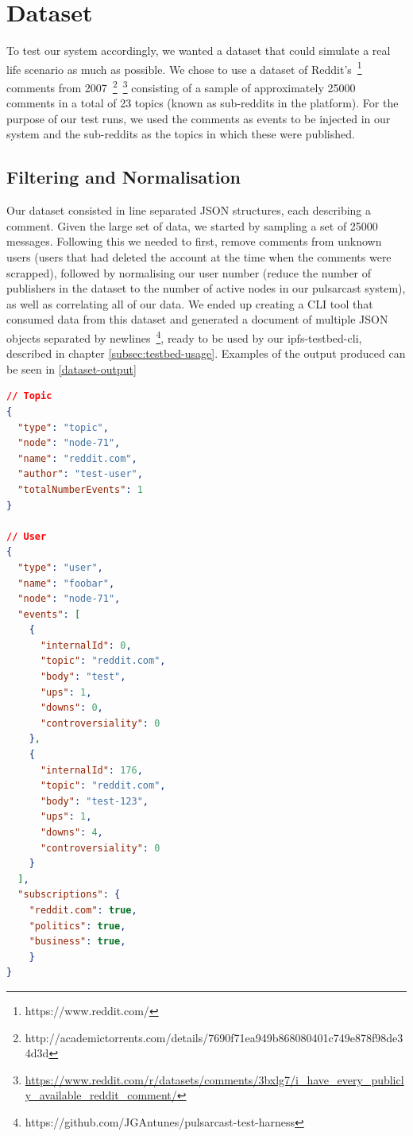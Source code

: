 \section{Dataset}\label{dataset}

To test our system accordingly, we wanted a dataset that could simulate a real
life scenario as much as possible. We chose to use a dataset of
Reddit's~\footnote{https://www.reddit.com/} comments from
2007~\footnote{http://academictorrents.com/details/7690f71ea949b868080401c749e878f98de34d3d}~\footnote{\url{https://www.reddit.com/r/datasets/comments/3bxlg7/i_have_every_publicly_available_reddit_comment/}} consisting of a sample of approximately 25000 comments in a total of 23 topics (known as sub-reddits in the platform). For the purpose of our test runs, we used the comments as events to be injected in our system and the sub-reddits as the topics in which these were published.

\subsection{Filtering and Normalisation}\label{subsec:filtering}

Our dataset consisted in line separated JSON structures, each describing a
comment. Given the large set of data, we started by sampling a set of 25000
messages.  Following this we needed to first, remove comments from unknown
users (users that had deleted the account at the time when the comments were
scrapped), followed by normalising our user number (reduce the number of
publishers in the dataset to the number of active nodes in our pulsarcast
system), as well as correlating all of our data. We ended up creating a CLI
tool that consumed data from this dataset and generated a document of multiple
JSON objects separated by
newlines~\footnote{https://github.com/JGAntunes/pulsarcast-test-harness}, ready
to be used by our ipfs-testbed-cli, described in chapter
\ref{subsec:testbed-usage}. Examples of the output produced can be seen in
\ref{dataset-output}

\begin{lstlisting}[language=JSON, float, caption={Data example to be used in testbed},label={dataset-output}]
// Topic
{
  "type": "topic",
  "node": "node-71",
  "name": "reddit.com",
  "author": "test-user",
  "totalNumberEvents": 1
}

// User
{
  "type": "user",
  "name": "foobar",
  "node": "node-71",
  "events": [
    {
      "internalId": 0,
      "topic": "reddit.com",
      "body": "test",
      "ups": 1,
      "downs": 0,
      "controversiality": 0
    },
    {
      "internalId": 176,
      "topic": "reddit.com",
      "body": "test-123",
      "ups": 1,
      "downs": 4,
      "controversiality": 0
    }
  ],
  "subscriptions": {
  	"reddit.com": true,
  	"politics": true,
  	"business": true,
	}
}
\end{lstlisting}

